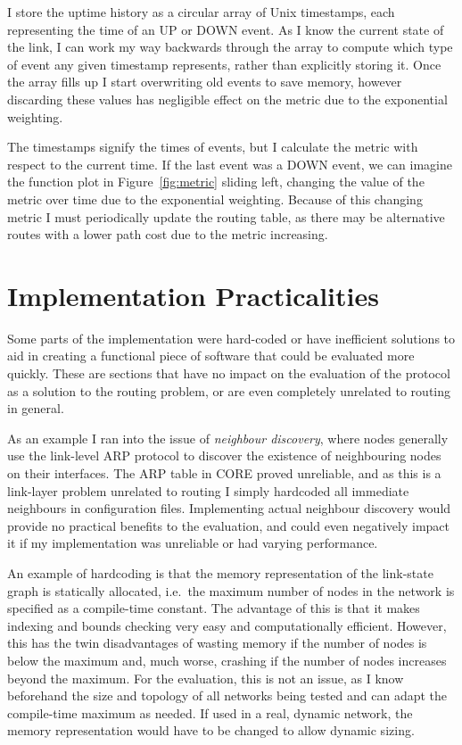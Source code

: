 \documentclass[withindex,glossary,openany]{cam-thesis}
\begin{document}
I store the uptime history as a circular array of Unix timestamps, each representing the time of an UP or DOWN event. As I know the current state of the link, I can work my way backwards through the array to compute which type of event any given timestamp represents, rather than explicitly storing it. Once the array fills up I start overwriting old events to save memory, however discarding these values has negligible effect on the metric due to the exponential weighting.

The timestamps signify the times of events, but I calculate the metric with respect to the current time. If the last event was a DOWN event, we can imagine the function plot in Figure~\ref{fig:metric} sliding left, changing the value of the metric over time due to the exponential weighting. Because of this changing metric I must periodically update the routing table, as there may be alternative routes with a lower path cost due to the metric increasing.

\section{Implementation Practicalities}

Some parts of the implementation were hard-coded or have inefficient solutions to aid in creating a functional piece of software that could be evaluated more quickly. These are sections that have no impact on the evaluation of the protocol as a solution to the routing problem, or are even completely unrelated to routing in general.

As an example I ran into the issue of \textit{neighbour discovery}, where nodes generally use the link-level ARP protocol to discover the existence of neighbouring nodes on their interfaces. The ARP table in CORE proved unreliable, and as this is a link-layer problem unrelated to routing I simply hardcoded all immediate neighbours in configuration files. Implementing actual neighbour discovery would provide no practical benefits to the evaluation, and could even negatively impact it if my implementation was unreliable or had varying performance.

An example of hardcoding is that the memory representation of the link-state graph is statically allocated, i.e.\ the maximum number of nodes in the network is specified as a compile-time constant. The advantage of this is that it makes indexing and bounds checking very easy and computationally efficient. However, this has the twin disadvantages of wasting memory if the number of nodes is below the maximum and, much worse, crashing if the number of nodes increases beyond the maximum. For the evaluation, this is not an issue, as I know beforehand the size and topology of all networks being tested and can adapt the compile-time maximum as needed. If used in a real, dynamic network, the memory representation would have to be changed to allow dynamic sizing.
\end{document}
